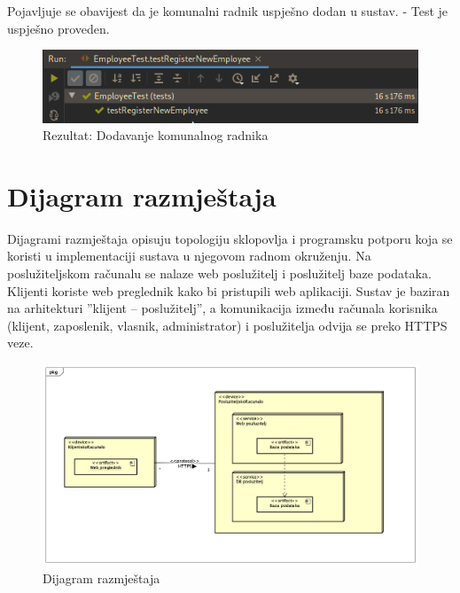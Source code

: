 		
			Pojavljuje se obavijest da je komunalni radnik uspješno dodan u sustav. - Test je uspješno proveden.

			\begin{figure}[H]
					\includegraphics[scale=0.57]{figures/admin-add-empl-pass.PNG}
					\centering
					\caption{Rezultat: Dodavanje komunalnog radnika}
					\label{fig:Dodavanje komunalnog radnika}
				\end{figure}


			
			\eject 
		
		
		\section{Dijagram razmještaja}
			
			Dijagrami razmještaja opisuju topologiju sklopovlja i programsku potporu koja se koristi u implementaciji sustava u njegovom radnom okruženju. Na poslužiteljskom računalu se nalaze web poslužitelj i poslužitelj baze podataka. Klijenti koriste web preglednik kako bi pristupili web aplikaciji. Sustav je baziran na arhitekturi ”klijent – poslužitelj”, a komunikacija između računala korisnika (klijent, zaposlenik, vlasnik, administrator) i poslužitelja odvija se preko HTTPS veze.
			
			\begin{figure}[H]
					\includegraphics[scale=0.4]{figures/Deployment Diagram0.PNG}
					\centering
					\caption{Dijagram razmještaja}
					\label{fig:Dijagram razmještaja}
				\end{figure}
			\eject 
		
